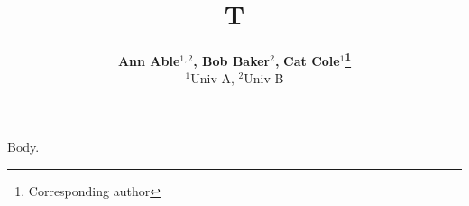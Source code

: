 \documentclass{article}
\begin{document}
\title{T}
\author{
  \textbf{Ann Able$^{1,2}$, Bob Baker$^{2}$,}
  \textbf{Cat Cole$^{1}$\thanks{Corresponding author}}\\
  $^{1}$Univ A, $^{2}$Univ B
}
\maketitle
Body.
\end{document}
